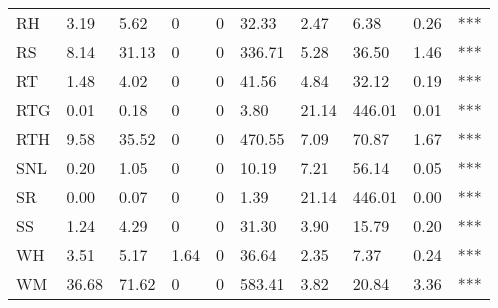 \begin{table}[]
\begin{tabular}{llllllllll}
RH       & 3.19   & 5.62   & 0      & 0   & 32.33   & 2.47     & 6.38     & 0.26  & ***             \\
RS       & 8.14   & 31.13  & 0      & 0   & 336.71  & 5.28     & 36.50    & 1.46  & ***             \\
RT       & 1.48   & 4.02   & 0      & 0   & 41.56   & 4.84     & 32.12    & 0.19  & ***             \\
RTG      & 0.01   & 0.18   & 0      & 0   & 3.80    & 21.14    & 446.01   & 0.01  & ***             \\
RTH      & 9.58   & 35.52  & 0      & 0   & 470.55  & 7.09     & 70.87    & 1.67  & ***             \\
SNL      & 0.20   & 1.05   & 0      & 0   & 10.19   & 7.21     & 56.14    & 0.05  & ***             \\
SR       & 0.00   & 0.07   & 0      & 0   & 1.39    & 21.14    & 446.01   & 0.00  & ***             \\
SS       & 1.24   & 4.29   & 0      & 0   & 31.30   & 3.90     & 15.79    & 0.20  & ***             \\
WH       & 3.51   & 5.17   & 1.64   & 0   & 36.64   & 2.35     & 7.37     & 0.24  & ***             \\
WM       & 36.68  & 71.62  & 0      & 0   & 583.41  & 3.82     & 20.84    & 3.36  & ***            
\end{tabular}
\end{table}